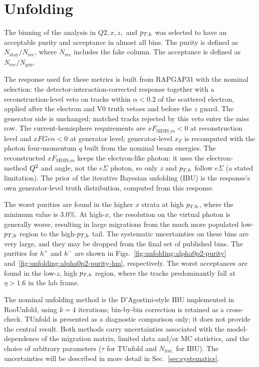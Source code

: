 \section{Unfolding}
\label{sec:unfolding}

The binning of the analysis in $Q2,x,z,$ and $p_{T,h}$ was selected to have an acceptable purity and acceptance in almost all bins. The purity is defined as $N_{\mathrm{stay}}/N_{\mathrm{rec}}$, where $N_{\mathrm{rec}}$ includes the fake column. The acceptance is defined as $N_{\mathrm{rec}}/N_{\mathrm{gen}}$.

The response used for these metrics is built from RAPGAP31 with the nominal
selection: the detector-interaction-corrected response together with a
reconstruction-level veto on tracks within $\alpha<0.2$ of the scattered
electron, applied after the electron and V0 truth vetoes and before the $z$ guard.  The
generator side is unchanged; matched tracks rejected by this veto enter the miss row.
The current-hemisphere requirements are $xF_{\mathrm{SIDIS\_es}}<0$ at
reconstruction level and $xFGen<0$ at generator level; generator-level $x_F$
is recomputed with the photon four-momentum $q$ built from the nominal beam energies.  The reconstructed
$xF_{\mathrm{SIDIS\_es}}$ keeps the electron-like photon: it uses the electron-method
$Q^{2}$ and angle, not the $e\Sigma$ photon, so only $z$ and $p_{T,h}$ follow
$e\Sigma$ (a stated limitation). The prior of the iterative Bayesian
unfolding (IBU) is the response's own generator-level truth distribution,
computed from this response.

The worst purities are found in the higher $x$ strata at high $p_{T,h}$, where the minimum value is 3.0\%. At high-$x$, the resolution on the virtual photon is generally worse, resulting in large migrations from the much more populated low-$p_{T,h}$ region to the high-$p_{T,h}$ tail. The systematic uncertainties on these bins are very large, and they may be dropped from the final set of published bins. The purities for $h^+$ and $h^-$ are shown in Figs.~\ref{fig:unfolding:alpha0p2-purity} and~\ref{fig:unfolding:alpha0p2-purity-hm}, respectively. The worst acceptances are found in the low-$z$, high $p_{T,h}$ region, where the tracks predominantly fall at $\eta>1.6$ in the lab frame.

The nominal unfolding method is the D'Agostini-style IBU implemented in RooUnfold, using $k=4$ iterations; bin-by-bin correction is retained as a cross-check. TUnfold is presented as a diagnostic comparison only; it does not provide the central result. Both methods carry uncertainties associated with the model-dependence of the migration matrix, limited data and/or MC statistics, and the choice of arbitrary parameters ($\tau$ for TUnfold and $N_{\mathrm{iter.}}$ for IBU). The uncertainties will be described in more detail in Sec.~\ref{sec:systematics}.

